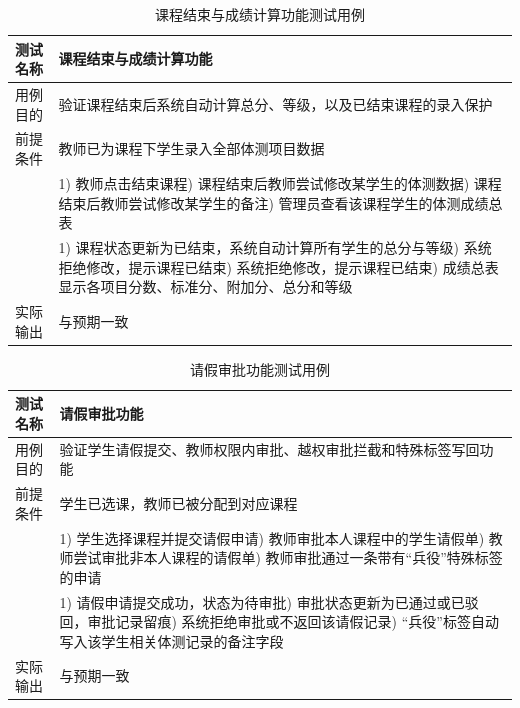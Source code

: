 \begin{table}[H]
  \centering
  \caption{课程结束与成绩计算功能测试用例}
  \label{tab:tc-score}
  \footnotesize
  \renewcommand{\arraystretch}{1.35}
  \begin{tabularx}{\textwidth}{|L{2.4cm}|X|}
    \hline
    测试名称 & 课程结束与成绩计算功能 \\
    \hline
    用例目的 & 验证课程结束后系统自动计算总分、等级，以及已结束课程的录入保护 \\
    \hline
    前提条件 & 教师已为课程下学生录入全部体测项目数据 \\
    \hline
     &
      1) 教师点击结束课程) 课程结束后教师尝试修改某学生的体测数据) 课程结束后教师尝试修改某学生的备注) 管理员查看该课程学生的体测成绩总表 \\
    \hline
     &
      1) 课程状态更新为已结束，系统自动计算所有学生的总分与等级) 系统拒绝修改，提示课程已结束) 系统拒绝修改，提示课程已结束) 成绩总表显示各项目分数、标准分、附加分、总分和等级 \\
    \hline
    实际输出 & 与预期一致 \\
    \hline
  \end{tabularx}
\end{table}

\begin{table}[H]
  \centering
  \caption{请假审批功能测试用例}
  \label{tab:tc-leave}
  \footnotesize
  \renewcommand{\arraystretch}{1.35}
  \begin{tabularx}{\textwidth}{|L{2.4cm}|X|}
    \hline
    测试名称 & 请假审批功能 \\
    \hline
    用例目的 & 验证学生请假提交、教师权限内审批、越权审批拦截和特殊标签写回功能 \\
    \hline
    前提条件 & 学生已选课，教师已被分配到对应课程 \\
    \hline
     &
      1) 学生选择课程并提交请假申请) 教师审批本人课程中的学生请假单) 教师尝试审批非本人课程的请假单) 教师审批通过一条带有“兵役”特殊标签的申请 \\
    \hline
     &
      1) 请假申请提交成功，状态为待审批) 审批状态更新为已通过或已驳回，审批记录留痕) 系统拒绝审批或不返回该请假记录) “兵役”标签自动写入该学生相关体测记录的备注字段 \\
    \hline
    实际输出 & 与预期一致 \\
    \hline
  \end{tabularx}
\end{table}

